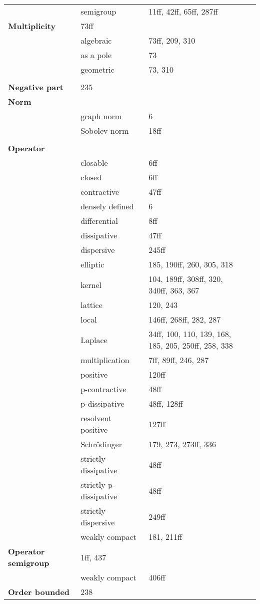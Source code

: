 \documentclass[10pt]{scrartcl}
\begin{document}
\begin{longtable}{>{\bfseries}p{4cm}p{4cm}p{4cm}p{4cm}}
	& semigroup 	& 11ff, 42ff, 65ff, 287ff \\
Multiplicity 	& 73ff \\
	& algebraic 	& 73ff, 209, 310 \\
	& as a pole 	& 73 \\
	& geometric 	& 73, 310 \\
	& \\
Negative part 	& 235 \\
Norm 	& \\
	& graph norm 	& 6 \\
	& Sobolev norm 	& 18ff \\
	& \\
Operator 	& \\
	& closable 	& 6ff \\
	& closed 	& 6ff \\
	& contractive 	& 47ff \\
	& densely defined 	& 6 \\
	& differential 	& 8ff \\
	& dissipative 	& 47ff \\
	& dispersive 	& 245ff \\
	& elliptic 	& 185, 190ff, 260, 305, 318 \\
	& kernel 	& 104, 189ff, 308ff, 320, 340ff, 363, 367 \\
	& lattice 	& 120, 243 \\
	& local 	& 146ff, 268ff, 282, 287 \\
	& Laplace 	&  34ff, 100, 110, 139, 168, 185, 205, 250ff, 258, 338 \\
	& multiplication 	& 7ff, 89ff, 246, 287 \\
	& positive 	& 120ff \\
	& p-contractive 	& 48ff \\
	& p-dissipative 	& 48ff, 128ff \\
	& resolvent positive 	& 127ff \\
	& Schrödinger 	& 179, 273, 273ff, 336 \\
	& strictly dissipative 	& 48ff \\
	& strictly p-dissipative 	& 48ff \\
	& strictly dispersive 	& 249ff \\
	& weakly compact 	& 181, 211ff \\
Operator semigroup 	& 1ff, 437 \\
	& weakly compact 	& 406ff \\
Order bounded 	& 238 \\

\end{longtable}
\end{document}
